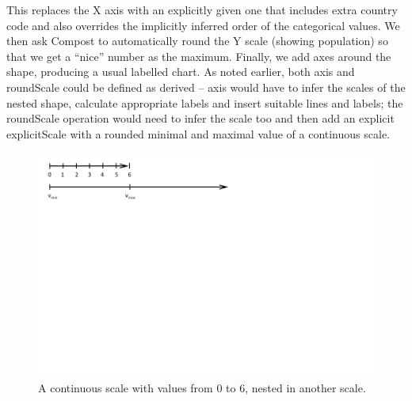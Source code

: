 \documentclass{jfp}
\newcommand{\kvd}[1]{\textnormal{\textcolor{kvdclr}{\sffamily #1}}}
\begin{document}
%
This replaces the X axis with an explicitly given one that includes extra country code and also
overrides the implicitly inferred order of the categorical values. We then ask Compost to
automatically round the Y scale (showing population) so that we get a ``nice'' number as the
maximum. Finally, we add axes around the shape, producing a usual labelled chart.
As noted earlier, both \kvd{axis} and \kvd{roundScale} could be defined as derived -- \kvd{axis}
would have to infer the scales of the nested shape, calculate appropriate labels and insert
suitable lines and labels; the \kvd{roundScale} operation would need to infer the scale too and
then add an explicit \kvd{explicitScale} with a rounded minimal and maximal value of a continuous
scale.
\begin{figure}[!h]
\includegraphics[scale=1,trim={0cm 7.5cm 6cm 0cm},clip]{nest.pdf}
\caption{A continuous scale with values from $0$ to $6$, nested in another scale.}
\label{fig:nesting}
\end{figure}
\end{document}
